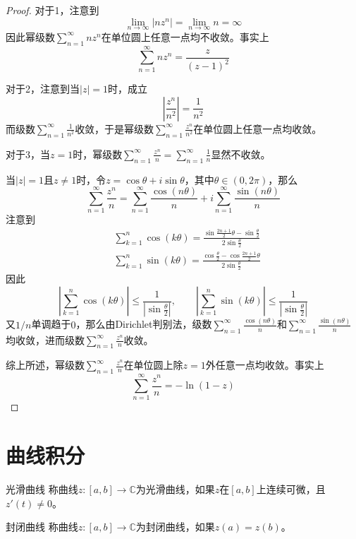 \documentclass[lang = cn, scheme = chinese, thmcnt = section]{elegantbook}
\newcommand{\C}{\mathbb{C}}  		   %
\newcommand{\dis}{\displaystyle}
\begin{document}
\begin{proof}
	对于1，注意到
	$$
	\lim_{n\to\infty}{|nz^n|}=\lim_{n\to\infty}{n}=\infty
	$$
	因此幂级数$\dis\sum_{n=1}^{\infty}{nz^n}$在单位圆上任意一点均不收敛。事实上%
	$$
	\sum_{n=1}^{\infty}{nz^n}=\frac{z}{(z-1)^2}
	$$
	
	对于2，注意到当$|z|=1$时，成立
	$$
	\left|\frac{z^n}{n^2}\right|=\frac{1}{n^2}
	$$
	而级数$\dis\sum_{n=1}^{\infty}{\frac{1}{n^2}}$收敛，于是幂级数$\dis\sum_{n=1}^{\infty}{\frac{z^n}{n^2}}$在单位圆上任意一点均收敛。
	
	对于3，当$z=1$时，幂级数$\dis\sum_{n=1}^{\infty}{\frac{z^n}{n}}=\dis\sum_{n=1}^{\infty}{\frac{1}{n}}$显然不收敛。
	
	当$|z|=1$且$z\ne 1$时，令$z=\cos\theta+i\sin\theta$，其中$\theta\in(0,2\pi)$，那么
	$$
	\sum_{n=1}^{\infty}{\frac{z^n}{n}}=
	\sum_{n=1}^{\infty}{\frac{\cos{(n\theta)}}{n}}+
	i\sum_{n=1}^{\infty}{\frac{\sin{(n\theta)}}{n}}
	$$
	注意到
	\begin{align*}
		& \sum_{k=1}^{n}{\cos{(k\theta)}}=\frac{\sin{\frac{2n+1}{2}\theta}-\sin{\frac{\theta}{2}}}{2\sin{\frac{\theta}{2}}}\\
		& \sum_{k=1}^{n}{\sin{(k\theta)}}=\frac{\cos{\frac{\theta}{2}}-\cos{\frac{2n+1}{2}\theta}}{2\sin{\frac{\theta}{2}}}
	\end{align*}
	因此
	$$
	\left|\sum_{k=1}^{n}{\cos{(k\theta)}}\right|\le \frac{1}{\left|\sin{\frac{\theta}{2}}\right|},
	\qquad
	\left|\sum_{k=1}^{n}{\sin{(k\theta)}}\right|\le \frac{1}{\left|\sin{\frac{\theta}{2}}\right|}
	$$
	又$1/n$单调趋于$0$，那么由Dirichlet判别法，级数$\dis\sum_{n=1}^{\infty}{\frac{\cos{(n\theta)}}{n}}$和$\dis\sum_{n=1}^{\infty}{\frac{\sin{(n\theta)}}{n}}$均收敛，进而级数$\dis\sum_{n=1}^{\infty}{\frac{z^n}{n}}$收敛。
	
	综上所述，幂级数$\dis\sum_{n=1}^{\infty}{\frac{z^n}{n}}$在单位圆上除$z=1$外任意一点均收敛。事实上%
	$$
	\sum_{n=1}^{\infty}{\frac{z^n}{n}}=-\ln(1-z)
	$$
\end{proof}

\section{曲线积分}

\begin{definition}{光滑曲线}
	称曲线$z:[a,b]\to \C$为光滑曲线，如果$z$在$[a,b]$上连续可微，且$z'(t)\ne 0$。
\end{definition}

\begin{definition}{封闭曲线}
	称曲线$z:[a,b]\to \C$为封闭曲线，如果$z(a)=z(b)$。
\end{definition}
\end{document}
